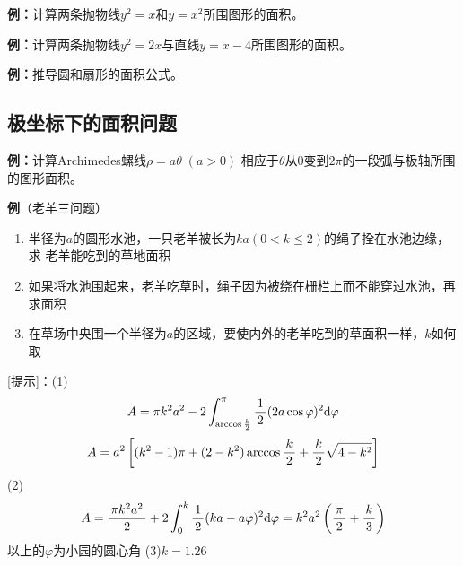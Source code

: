 {\bf 例：}计算两条抛物线$y^2=x$和$y=x^2$所围图形的面积。

{\bf 例：}计算两条抛物线$y^2=2x$与直线$y=x-4$所围图形的面积。

{\bf 例：}推导圆和扇形的面积公式。

\subsection{极坐标下的面积问题}

{\bf 例：}计算Archimedes螺线$\rho=a\theta\;(a>0)$
相应于$\theta$从$0$变到$2\pi$的一段弧与极轴所围的图形面积。

\begin{center}
\end{center}

{\bf 例}（老羊三问题）
\begin{enumerate}[(1)]
  \setlength{\itemindent}{1cm}
  \item 半径为$a$的圆形水池，一只老羊被长为$ka(0<k\leq2)$的绳子拴在水池边缘，求
  老羊能吃到的草地面积
  \item 如果将水池围起来，老羊吃草时，绳子因为被绕在栅栏上而不能穿过水池，再求面积
  \item 在草场中央围一个半径为$a$的区域，要使内外的老羊吃到的草面积一样，$k$如何取
\end{enumerate}

[提示]：(1)
$$A=\pi k^2a^2-2\displaystyle\int_{\arccos\frac k2}^{\pi}\displaystyle\frac{\,{1}\,}{\,{2}\,}(2a\cos\varphi)^2
\mathrm{d}\varphi$$
$$A=a^2\left[(k^2-1)\pi+(2-k^2)\arccos\displaystyle\frac{\,{k}\,}{\,{2}\,}+\displaystyle\frac{\,{k}\,}{\,{2}\,}
\sqrt{4-k^2}\right]$$
(2)
$$A=\displaystyle\frac{\,{\pi k^2a^2}\,}{\,{2}\,}+2\displaystyle\int_0^k\displaystyle\frac{\,{1}\,}{\,{2}\,}(ka-a\varphi)^2\mathrm{d}\varphi=k^2a^2
\left(\displaystyle\frac{\,{\pi}\,}{\,{2}\,}+\displaystyle\frac{\,{k}\,}{\,{3}\,}\right)$$
以上的$\varphi$为小园的圆心角
(3)$k=1.26$

